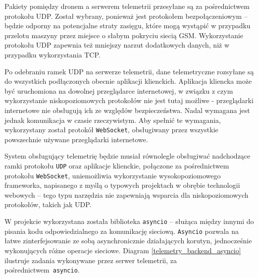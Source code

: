 Pakiety pomiędzy dronem a serwerem telemetrii przesyłane są za pośrednictwem protokołu
UDP. Został wybrany, ponieważ jest protokołem bezpołączeniowym -- będzie odporny na
potencjalne straty zasięgu, które mogą wystąpić w przypadku
przelotu maszyny przez miejsce o słabym pokryciu siecią GSM. Wykorzystanie protokołu
UDP zapewnia też mniejszy narzut dodatkowych danych, niż w przypadku wykorzystania
TCP.

Po odebraniu ramek UDP na serwerze telemetrii, dane telemetryczne rozsyłane są do
wszystkich podłączonych obecnie aplikacji klienckich. Aplikacja kliencka może
być uruchomiona na dowolnej przeglądarce internetowej, w związku z czym wykorzystanie
niskopoziomowych protokołów nie jest tutaj możliwe - przeglądarki internetowe nie 
obsługują ich ze względów bezpieczeństwa. Nadal wymagana jest jednak komunikacja
w czasie rzeczywistym. 
Aby spełnić te wymagania, wykorzystany został protokół \texttt{WebSocket}\cite{websocket},
obsługiwany przez wszystkie powszechnie używane przeglądarki internetowe.

System obsługujący telemetrię będzie musiał równolegle obsługiwać nadchodzące
ramki protokołu \texttt{UDP} oraz aplikacje klienckie, połączone za pośrednictwem protokołu 
\texttt{WebSocket}, uniemożliwia wykorzystanie wysokopoziomowego frameworka,
napisanego z myślą o typowych projektach w obrębie technologii webowych --
tego typu narzędzia nie zapewniają wsparcia dla niskopoziomowych protokołów,
takich jak UDP.

W projekcie wykorzystana została biblioteka \texttt{asyncio} -- służąca między innymi
do pisania kodu odpowiedzialnego za komunikację sieciową\cite{asyncio}.
\texttt{Asyncio} pozwala na łatwe zinterfejsowanie ze sobą asynchronicznie działających
korutyn, jednocześnie wykonujących różne operacje sieciowe. Diagram \ref{telemetry_backend_asyncio}
ilustruje zadania wykonywane przez serwer telemetrii, za pośrednictwem~\texttt{asyncio}. 

